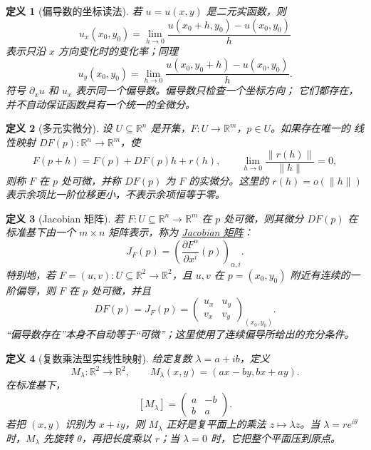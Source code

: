 \documentclass[UTF8,fontset=none,a4paper,11pt]{ctexart}
\theoremstyle{foundation-definition}
\newtheorem{definition}{定义}[section]
\theoremstyle{foundation-theorem}
\theoremstyle{foundation-proposition}
\theoremstyle{foundation-example}
\theoremstyle{foundation-remark}
\theoremstyle{foundation-theorem}
\newcommand{\term}[2]{\hyperref[#1]{#2}}
\begin{document}
\begin{definition}[偏导数的坐标读法]\label{def:partial-derivative}
若 \(u=u(x,y)\) 是二元实函数，则
\[
u_x(x_0,y_0)
=\lim_{h\to0}
\frac{u(x_0+h,y_0)-u(x_0,y_0)}{h}
\]
表示只沿 \(x\) 方向变化时的变化率；同理
\[
u_y(x_0,y_0)
=\lim_{h\to0}
\frac{u(x_0,y_0+h)-u(x_0,y_0)}{h}.
\]
符号 \(\partial_xu\) 和 \(u_x\) 表示同一个偏导数。偏导数只检查一个坐标方向；
它们都存在，并不自动保证函数具有一个统一的全微分。
\end{definition}

\begin{definition}[多元实微分]\label{def:total-differential}
设 \(U\subseteq\mathbb R^n\) 是开集，\(F:U\to\mathbb R^m\)，\(p\in U\)。如果存在唯一的
线性映射 \(DF(p):\mathbb R^n\to\mathbb R^m\)，使
\[
 F(p+h)=F(p)+DF(p)h+r(h),\qquad
 \lim_{h\to0}\frac{\lVert r(h)\rVert}{\lVert h\rVert}=0,
\]
则称 \(F\) 在 \(p\) 处可微，并称 \(DF(p)\) 为 \(F\) 的实微分。这里的
\(r(h)=o(\lVert h\rVert)\) 表示余项比一阶位移更小，不表示余项恒等于零。

\end{definition}

\begin{definition}[Jacobian 矩阵]\label{def:jacobian-matrix}
若 \(F:U\subseteq\mathbb R^n\to\mathbb R^m\) 在 \(p\) 处可微，则其微分
\(DF(p)\) 在标准基下由一个 \(m\times n\) 矩阵表示，称为
\term{def:jacobian-matrix}{Jacobian 矩阵}：
\[
 J_F(p)=\left(\frac{\partial F^\alpha}{\partial x^i}(p)\right)_{\alpha,i}.
\]
特别地，若 \(F=(u,v):U\subseteq\mathbb R^2\to\mathbb R^2\)，且 \(u,v\) 在 \(p=(x_0,y_0)\)
附近有连续的一阶偏导，则 \(F\) 在 \(p\) 处可微，并且
\[
 DF(p)=J_F(p)=
 \begin{pmatrix}u_x&u_y\\v_x&v_y\end{pmatrix}_{(x_0,y_0)}.
\]
“偏导数存在”本身不自动等于“可微”；这里使用了连续偏导所给出的充分条件。
\end{definition}

\begin{definition}[复数乘法型实线性映射]\label{def:complex-multiplication-linear-map}
给定复数 \(\lambda=a+ib\)，定义
\[
M_\lambda:\mathbb R^2\longrightarrow\mathbb R^2,\qquad
M_\lambda(x,y)=(ax-by,bx+ay).
\]
在标准基下，
\[
[M_\lambda]=
\begin{pmatrix}a&-b\\ b&a\end{pmatrix}.
\]
若把 \((x,y)\) 识别为 \(x+iy\)，则 \(M_\lambda\) 正好是复平面上的乘法
\(z\mapsto\lambda z\)。当 \(\lambda=re^{i\theta}\) 时，\(M_\lambda\) 先旋转
\(\theta\)，再把长度乘以 \(r\)；当 \(\lambda=0\) 时，它把整个平面压到原点。
\end{definition}
\end{document}

